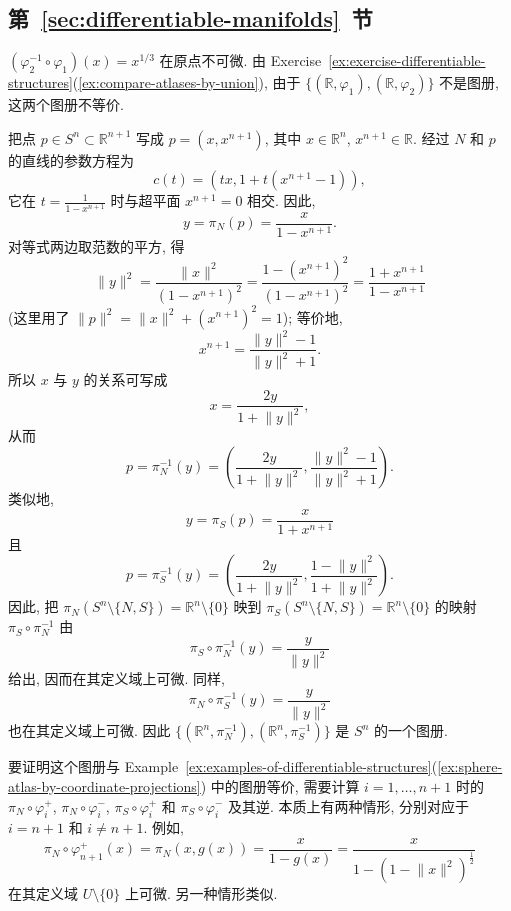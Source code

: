 \subsection{\texorpdfstring{第~\ref{sec:differentiable-manifolds}~节}{可微流形}}\label{subsec:solutions-differentiable-structures}

\begin{description}[font=\normalfont,leftmargin=2em,labelwidth=1.5em]
$(\varphi_2^{-1}\circ\varphi_1)(x)=x^{1/3}$ 在原点不可微. 由 Exercise~\ref{ex:exercise-differentiable-structures}(\ref{ex:compare-atlases-by-union}), 由于 $\{(\mathbb{R},\varphi_1),(\mathbb{R},\varphi_2)\}$ 不是图册, 这两个图册不等价.

把点 $p\in S^n\subset\mathbb{R}^{n+1}$ 写成 $p=(x,x^{n+1})$, 其中 $x\in\mathbb{R}^n$, $x^{n+1}\in\mathbb{R}$. 经过 $N$ 和 $p$ 的直线的参数方程为
\[
  c(t)=(tx,1+t(x^{n+1}-1)),
\]
它在 $t=\frac{1}{1-x^{n+1}}$ 时与超平面 $x^{n+1}=0$ 相交. 因此,
\[
  y=\pi_N(p)=\frac{x}{1-x^{n+1}}.
\]
对等式两边取范数的平方, 得
\[
  \lVert y\rVert^2
  =\frac{\lVert x\rVert^2}{(1-x^{n+1})^2}
  =\frac{1-(x^{n+1})^2}{(1-x^{n+1})^2}
  =\frac{1+x^{n+1}}{1-x^{n+1}}
\]
(这里用了 $\lVert p\rVert^2=\lVert x\rVert^2+(x^{n+1})^2=1$); 等价地,
\[
  x^{n+1}=\frac{\lVert y\rVert^2-1}{\lVert y\rVert^2+1}.
\]
所以 $x$ 与 $y$ 的关系可写成
\[
  x=\frac{2y}{1+\lVert y\rVert^2},
\]
从而
\[
  p=\pi_N^{-1}(y)
  =\left(\frac{2y}{1+\lVert y\rVert^2},\frac{\lVert y\rVert^2-1}{\lVert y\rVert^2+1}\right).
\]
类似地,
\[
  y=\pi_S(p)=\frac{x}{1+x^{n+1}}
\]
且
\[
  p=\pi_S^{-1}(y)
  =\left(\frac{2y}{1+\lVert y\rVert^2},\frac{1-\lVert y\rVert^2}{1+\lVert y\rVert^2}\right).
\]
因此, 把 $\pi_N(S^n\setminus\{N,S\})=\mathbb{R}^n\setminus\{0\}$ 映到 $\pi_S(S^n\setminus\{N,S\})=\mathbb{R}^n\setminus\{0\}$ 的映射 $\pi_S\circ\pi_N^{-1}$ 由
\[
  \pi_S\circ\pi_N^{-1}(y)=\frac{y}{\lVert y\rVert^2}
\]
给出, 因而在其定义域上可微. 同样,
\[
  \pi_N\circ\pi_S^{-1}(y)=\frac{y}{\lVert y\rVert^2}
\]
也在其定义域上可微. 因此 $\{(\mathbb{R}^n,\pi_N^{-1}),(\mathbb{R}^n,\pi_S^{-1})\}$ 是 $S^n$ 的一个图册.

要证明这个图册与 Example~\ref{ex:examples-of-differentiable-structures}(\ref{ex:sphere-atlas-by-coordinate-projections}) 中的图册等价, 需要计算 $i=1,\ldots,n+1$ 时的 $\pi_N\circ\varphi_i^+$, $\pi_N\circ\varphi_i^-$, $\pi_S\circ\varphi_i^+$ 和 $\pi_S\circ\varphi_i^-$ 及其逆. 本质上有两种情形, 分别对应于 $i=n+1$ 和 $i\ne n+1$. 例如,
\[
  \pi_N\circ\varphi_{n+1}^+(x)
  =\pi_N(x,g(x))
  =\frac{x}{1-g(x)}
  =\frac{x}{1-(1-\lVert x\rVert^2)^{\frac12}}
\]
在其定义域 $U\setminus\{0\}$ 上可微. 另一种情形类似.


\end{description}
